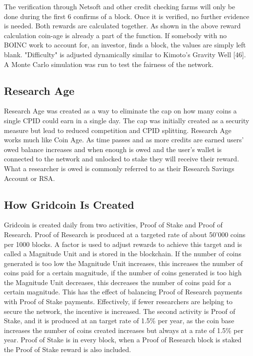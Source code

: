The verification through Netsoft and other credit checking farms will only be done during the first 6 confirms of a block. Once it is verified, no further evidence is needed. Both rewards are calculated together. As shown in the above reward calculation coin-age is already a part of the function. If somebody with no BOINC work to account for, an investor, finds a block, the values are simply left blank. "Difficulty" is adjusted dynamically similar to Kimoto's Gravity Well [46]. A Monte Carlo simulation was run to test the fairness of the network.

\subsection{Research Age}

Research Age was created as a way to eliminate the cap on how many coins a single CPID could earn in a single day. The cap was initially created as a security measure but lead to reduced competition and CPID splitting. Research Age works much like Coin Age. As time passes and as more credits are earned users' owed balance increases and when enough is owed and the user's wallet is connected to the network and unlocked to stake they will receive their reward. What a researcher is owed is commonly referred to as their Research Savings Account or RSA.


\subsection{How Gridcoin Is Created}

Gridcoin is created daily from two activities, Proof of Stake and Proof of Research. Proof of Research is produced at a targeted rate of about 50'000 coins per 1000 blocks. A factor is used to adjust rewards to achieve this target and is called a Magnitude Unit and is stored in the blockchain. If the number of coins generated is too low the Magnitude Unit increases, this increases the number of coins paid for a certain magnitude, if the number of coins generated is too high the Magnitude Unit decreases, this decreases the number of coins paid for a certain magnitude. This has the effect of balancing Proof of Research payments with Proof of Stake payments. Effectively, if fewer researchers are helping to secure the network, the incentive is increased. The second activity is Proof of Stake, and it is produced at an target rate of 1.5\% per year, as the coin base increases the number of coins created increases but always at a rate of 1.5\% per year. Proof of Stake is in every block, when a Proof of Research block is staked the Proof of Stake reward is also included.

